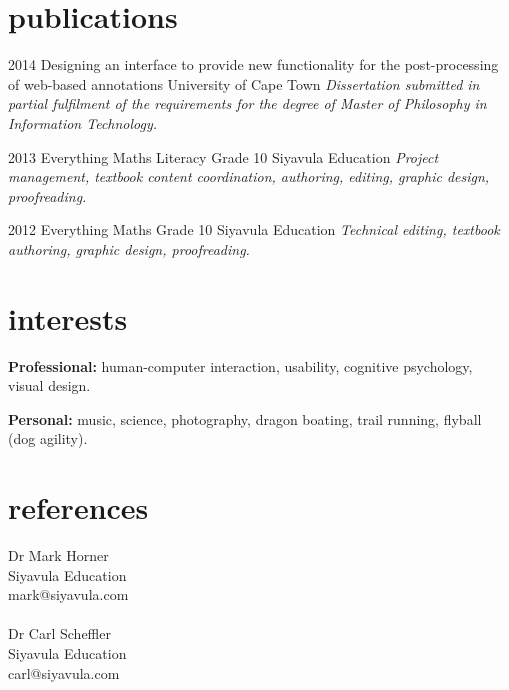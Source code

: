 \documentclass[]{friggeri-cv} %
\begin{document}
\section{publications}
\begin{entrylist}
\entry
{2014}
{Designing an interface to provide new
functionality for the post-processing of
web-based annotations}
{University of Cape Town}
{\emph{
Dissertation submitted in partial fulfilment of the requirements
for the degree of Master of Philosophy in Information Technology.} 
 }



\entry
{2013}
{Everything Maths Literacy Grade 10}
{Siyavula Education}
{\emph{Project management, textbook content coordination, authoring, editing, graphic design, proofreading.}}

\entry
{2012}
{Everything Maths Grade 10}
{Siyavula Education}
{\emph{Technical editing, textbook authoring, graphic design, proofreading.}}

\end{entrylist}


\section{interests}

\textbf{Professional:} human-computer interaction, usability, cognitive psychology, visual design.

\textbf{Personal:} music, science, photography, dragon boating, trail running, flyball (dog agility).


\section{references}

Dr Mark Horner\\
Siyavula Education\\
mark@siyavula.com\\
\\
Dr Carl Scheffler\\
Siyavula Education\\
carl@siyavula.com\\
\end{document}
